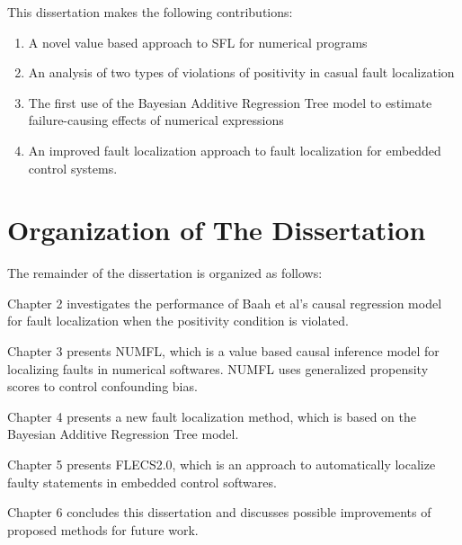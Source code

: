 This dissertation makes the following contributions: 
\begin{enumerate}
\item A novel value based approach to SFL for numerical programs
\item An analysis of two types of violations of positivity in casual fault localization
\item The first use of the Bayesian Additive Regression Tree model to estimate failure-causing effects of numerical expressions
\item An improved fault localization approach to fault localization for embedded control systems.
\end{enumerate}

\section{Organization of The Dissertation}

The remainder of the dissertation is organized as follows:

Chapter 2 investigates the performance of Baah et al’s causal regression model for fault localization when the positivity condition is violated.

Chapter 3 presents NUMFL, which is a value based causal inference model for localizing faults in numerical softwares. NUMFL uses generalized propensity scores to control confounding bias.

Chapter 4 presents a new fault localization method, which is based on  the Bayesian Additive Regression Tree model.

Chapter 5 presents FLECS2.0, which is an approach to automatically localize faulty statements in embedded control softwares.

Chapter 6 concludes this dissertation and discusses possible improvements of proposed methods for future work.



